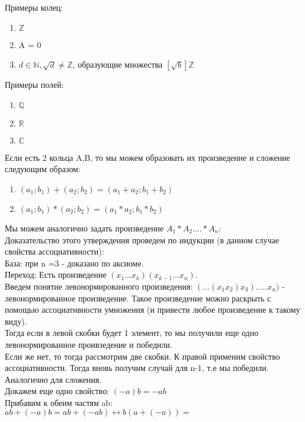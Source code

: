 \documentclass{article}
\begin{document}
Примеры колец:
\begin{enumerate}
\item $\mathbb{Z}$
\item A = 0
\item $d \in \mathbb{N}, \sqrt{d} \neq \mathbb{Z}$, образующие множества $[\sqrt{b}] \mathbb{Z}$
\end{enumerate}
Примеры полей:
\begin{enumerate}
\item $\mathbb{Q}$
\item $\mathbb{R}$
\item $\mathbb{C}$
\end{enumerate}
Если есть 2 кольца A,B, то мы можем образовать их произведение и сложение следующим образом:
\begin{enumerate}
\item $(a_1;b_1)+(a_2;b_2) = (a_1+a_2;b_1+b_2)$
\item $(a_1;b_1)*(a_2;b_2) = (a_1*a_2;b_1*b_2)$
\end{enumerate}
Мы можем аналогично задать произведение $A_1*A_2....*A_n$:\\
Доказательство этого утверждения проведем по индукции (в данном случае свойства ассоциативности):\\
База: при n =3 - доказано по аксиоме.\\
Переход: Есть произведение $(x_1...x_k)(x_{k-1}...x_n)$.\\
Введем понятие левонормированного произведения: $(...(x_1x_2)x_3).....x_n)$ - левонормированное произведение. Такое произведение можно раскрыть с помощью ассоциативности умножения (и привести любое произведение к такому виду).\\
Тогда если в левой скобки будет 1 элемент, то мы получили еще одно левонормированное проивзедение и победили.\\
Если же нет, то тогда рассмотрим две скобки. К правой применим свойство ассоциативности. Тогда вновь получим случай для n-1, т.е мы победили.\\
Аналогично для сложения.\\
Докажем еще одно свойство:
$(-a)b=-ab$\\
Прибавим к обеим частям ab:\\
$ab+(-a)b=ab+(-ab) \leftrightarrow b(a+(-a))=$
\end{document}
